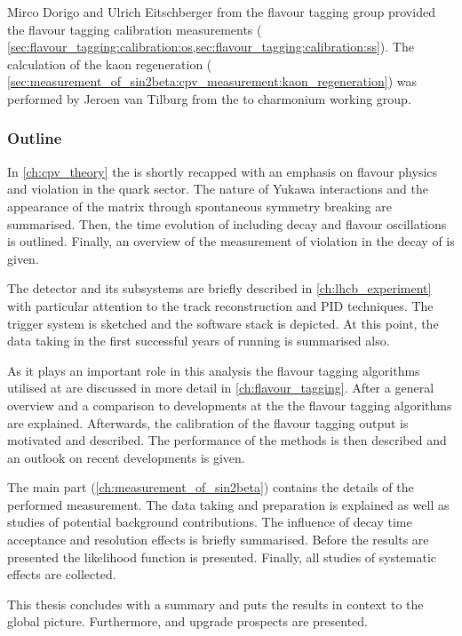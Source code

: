 Mirco Dorigo and Ulrich Eitschberger from the flavour tagging group provided the
flavour tagging calibration measurements (\cf
\cref{sec:flavour_tagging:calibration:os,sec:flavour_tagging:calibration:ss}).
The calculation of the kaon regeneration (\cf
\cref{sec:measurement_of_sin2beta:cpv_measurement:kaon_regeneration}) was
performed by Jeroen van Tilburg from the \B to charmonium working group.

\subsubsection*{Outline}

In \cref{ch:cpv_theory} the \SM is shortly recapped with an emphasis on flavour
physics and \CP violation in the quark sector. The nature of Yukawa
interactions and the appearance of the \CKM matrix through spontaneous symmetry
breaking are summarised. Then, the time evolution of \Bmesons including decay
and flavour oscillations is outlined. Finally, an overview of the measurement of
\CP violation in the decay of \BdToJpsiKS is given.

The \LHCb detector and its subsystems are briefly described in
\cref{ch:lhcb_experiment} with particular attention to the track reconstruction
and \acl{PID} techniques. The \LHCb trigger system is sketched and the software
stack is depicted. At this point, the data taking in the first successful years
of running is summarised also.

As it plays an important role in this analysis the flavour tagging algorithms
utilised at \LHCb are discussed in more detail in \cref{ch:flavour_tagging}.
After a general overview and a comparison to developments at the \BFactories the
flavour tagging algorithms are explained. Afterwards, the calibration of the
flavour tagging output is motivated and described. The performance of the
methods is then described and an outlook on recent developments is given.

The main part (\cref{ch:measurement_of_sin2beta}) contains the details of the
performed measurement. The data taking and preparation is explained as well as
studies of potential background contributions. The influence of decay time
acceptance and resolution effects is briefly summarised. Before the results are
presented the likelihood function is presented. Finally, all studies of
systematic effects are collected.

This thesis concludes with a summary and puts the results in context to the
global \CKM picture. Furthermore, \RunTwo and \LHCb upgrade prospects are
presented.
